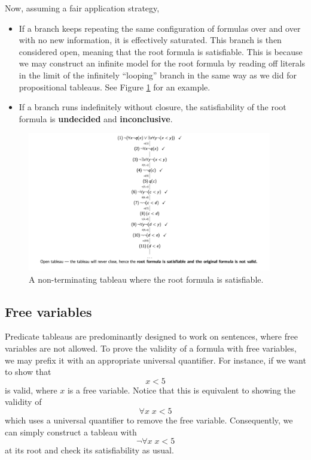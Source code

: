 Now, assuming a fair application strategy,
%
\begin{itemize}
    \item If a branch keeps repeating the same configuration of formulas over and over with no new information, it is effectively saturated. This branch is then considered open, meaning that the root formula is satisfiable. This is because we may construct an infinite model for the root formula by reading off literals in the limit of the infinitely ``looping'' branch in the same way as we did for propositional tableaus. See Figure \ref{fig:Ch04-non-terminating-tableau} for an example.
    \item If a branch runs indefinitely without closure, the satisfiability of the root formula is \textbf{undecided} and \textbf{inconclusive}.
\end{itemize}


\begin{figure}[H]
    \centering
    \includegraphics[width=0.95\textwidth]{Images/04a_NonterminatingPredicateTableau.png}
    \caption{A non-terminating tableau where the root formula is satisfiable.}
    \label{fig:Ch04-non-terminating-tableau}
\end{figure}



\subsection{Free variables}

Predicate tableaus are predominantly designed to work on sentences, where free variables are not allowed. To prove the validity of a formula with free variables, we may prefix it with an appropriate universal quantifier. For instance, if we want to show that
%
\[x < 5\]
%
is valid, where \(x\) is a free variable. Notice that this is equivalent to showing the validity of
%
\[\forall x\; x < 5\]
%
which uses a universal quantifier to remove the free variable. Consequently, we can simply construct a tableau with
%
\[\neg\forall x\; x < 5\]
%
at its root and check its satisfiability as usual.



